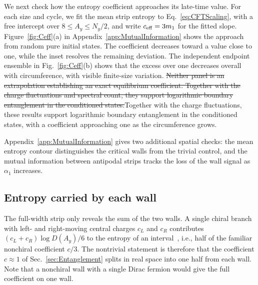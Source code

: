 \documentclass[aps,prb,10pt,twocolumn,superscriptaddress,longbibliography,floatfix]{revtex4-2}
\newcommand{\newtext}[1]{{\color{blue}#1}}
\newcommand{\claudeadd}[1]{{\color{orange}#1}}
\newcommand{\claudedel}[1]{{\color{orange}\sout{#1}}}
\begin{document}
{\color{blue}
We next check how the entropy coefficient approaches its late-time value. For each size and cycle, we fit the mean strip entropy to Eq.~\eqref{eq:CFTScaling}, with a free intercept over $8\leq A_y\leq N_y/2$, and write $c_{\rm eff}=3m_1$ for the fitted slope. Figure~\ref{fig:Ceff}(a) in Appendix~\ref{app:MutualInformation} shows the approach from random pure initial states. The coefficient decreases toward a value close to one, while the inset resolves the remaining deviation. The independent endpoint ensemble in Fig.~\ref{fig:Ceff}(b) shows that the excess over one decreases overall with circumference, with visible finite-size variation. \claudedel{Neither panel is an extrapolation establishing an exact equilibrium coefficient. Together with the charge fluctuations and spectral count, they support logarithmic boundary entanglement in the conditioned states.}\claudeadd{Together with the charge fluctuations, these results support logarithmic boundary entanglement in the conditioned states, with a coefficient approaching one as the circumference grows.}
}



{\color{blue}
Appendix~\ref{app:MutualInformation} gives two additional spatial checks: the mean entropy contour distinguishes the critical walls from the trivial control, and the mutual information between antipodal strips tracks the loss of the wall signal as $\alpha_1$ increases.
}

{\color{blue}\subsection{Entropy carried by each wall}
\label{sec:ChiralCentralCharge}}

The full-width strip only reveals the sum of the two walls. A single chiral branch with left- and right-moving central charges $c_L$ and $c_R$ contributes \newtext{$(c_L+c_R)\log D(A_y)/6$} to the entropy of an interval~\cite{CalabreseCardy2004,CastroDetournayIqbalPerlmutter2014}, i.e., half of the familiar nonchiral coefficient $c/3$. The nontrivial statement is therefore that the coefficient $c\approx1$ of Sec.~\ref{sec:Entanglement} splits in real space into one half from each wall. Note that a nonchiral wall with a single Dirac fermion would give the full coefficient on one wall.
\end{document}

